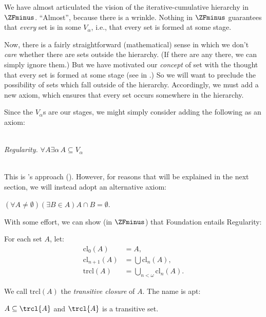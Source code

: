\documentclass[../../../include/open-logic-section]{subfiles}
\begin{document}


We have almost articulated the vision of the iterative-cumulative
hierarchy in~$\ZFminus$. ``Almost'', because there is a wrinkle. Nothing in
$\ZFminus$ guarantees that \emph{every} set is in some $V_\alpha$,
i.e., that every set is formed at some stage. 

Now, there is a fairly straightforward (mathematical) sense in which
we don't \emph{care} whether there are sets outside the hierarchy. (If
there are any there, we can simply ignore them.) But we have motivated
our \emph{concept} of set with the thought that every set is formed at
some stage (see \stageshier{} in .) So
we will want to preclude the possibility of sets which fall outside of
the hierarchy. Accordingly, we must add a new axiom, which ensures
that every set occurs somewhere in the hierarchy. 

Since the $V_\alpha$s are our stages, we might simply consider adding
the following as an axiom:

\
\\\emph{Regularity.} $\forall A \exists \alpha\, A \subseteq V_\alpha$

\ \\This is \citeauthor{VonNeumann1925}'s approach
(\citeyear{VonNeumann1925}). However, for reasons that will be
explained in the next section, we will instead adopt an alternative
axiom:

\begin{axiom}[Foundation]
$(\forall A \neq \emptyset)(\exists B \in A)A \cap B = \emptyset$.
\end{axiom}

With some effort, we can show (in $\ZFminus$) that Foundation entails Regularity:
\begin{defn}
For each set $A$, let:
\begin{align*}
	\text{cl}_0(A) &= A,\\
	\text{cl}_{n+1}(A) &= \bigcup \text{cl}_n(A),\\
	\text{trcl}(A) &= \bigcup_{n < \omega} \text{cl}_{n}(A).
\end{align*}
\end{defn}

We call $\text{trcl}(A)$ the \emph{transitive closure} of $A$. The name is apt:

\begin{prop}
$A \subseteq \trcl{A}$ and $\trcl{A}$ is a transitive set. 
\end{prop}
\end{document}
